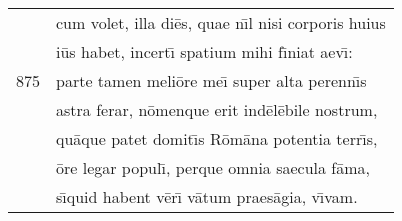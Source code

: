 \documentclass[paper=6in:9in,pagesize=pdftex,
               headinclude=on,footinclude=on,12pt]{scrbook}
\begin{document}
\begin{longtable}[p]{ r l }
 & cum volet, illa di\=es, quae n\={\i}l nisi corporis huius\\ 
 & i\=us habet, incert\={\i} spatium mihi f\={\i}niat aev\={\i}:\\ 
875 & parte tamen meli\=ore me\={\i} super alta perenn\={\i}s\\ 
 & astra ferar, n\=omenque erit ind\=el\=ebile nostrum,\\ 
 & qu\=aque patet domit\={\i}s R\=om\=ana potentia terr\={\i}s,\\ 
 & \=ore legar popul\={\i}, perque omnia saecula f\=ama,\\ 
 & s\={\i}quid habent v\=er\={\i} v\=atum praes\=agia, v\={\i}vam.\\ 

\end{longtable}
\end{document}
